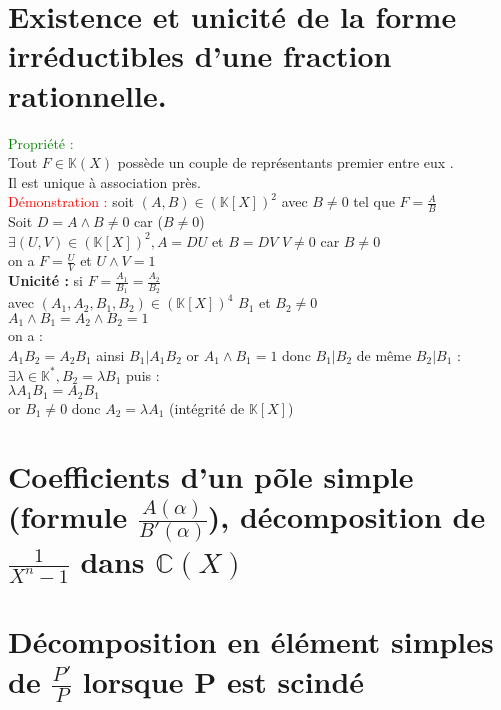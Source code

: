 \documentclass{article}
\begin{document}
\section{Existence et unicité de la forme irréductibles d'une fraction rationnelle.}
\textcolor{green}{Propriété :} \\
Tout $F \in \mathbb K (X)$ possède un couple de représentants premier entre eux . \\
Il est unique à association près. \\
\textcolor{red}{Démonstration :} soit $(A,B) \in (\mathbb K[X])^2$ avec $B \neq 0$ tel que $F=\frac{A}{B}$ \\
Soit $D=A \wedge B \neq 0$ car ($B \neq 0$) \\
$\exists (U,V) \in (\mathbb K [X])^2, A=DU$ et $B=DV$ $V \neq 0$ car $B \neq 0$ \\
on a $F= \frac{U}{V}$ et $U \wedge V=1$ \\
{\bf Unicité :} si $F=\frac{A_1}{B_1}=\frac{A_2}{B_2}$ \\
avec $(A_1,A_2,B_1,B_2) \in (\mathbb K [X])^4$ $B_1$ et $B_2 \neq 0$ \\
$A_1 \wedge B_1= A_2 \wedge B_2=1$ \\
on a : \\
$A_1B_2=A_2B_1$ ainsi $B_1|A_1B_2$ or $A_1 \wedge B_1=1$ donc $B_1|B_2$ de même $B_2|B_1$ :\\
$\exists \lambda \in \mathbb K^*,B_2= \lambda B_1$ puis : \\
$\lambda A_1 B_1=A_2B_1$ \\
or $B_1 \neq 0$ donc $A_2= \lambda A_1$ (intégrité de $\mathbb K [X]$)
\section{Coefficients d'un põle simple (formule $\frac{A(\alpha)}{B'(\alpha)}$), décomposition de $\frac{1}{X^n-1}$ dans $\mathbb{C}(X)$}
\section{Décomposition en élément simples de $\frac{P'}{P}$ lorsque P est scindé}
\end{document}
